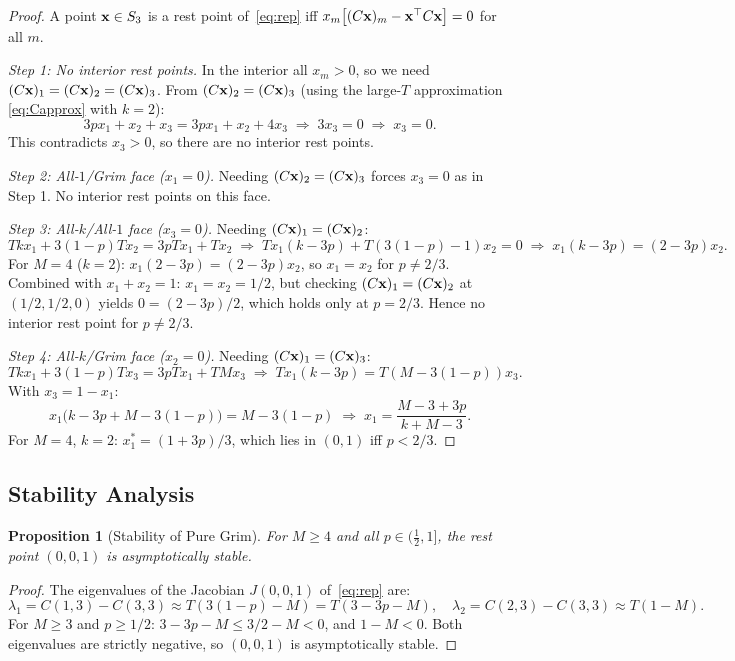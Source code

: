 \documentclass[12pt,a4paper]{article}
\newtheorem{proposition}{Proposition}[section]
\begin{document}
\begin{proof}
A point ${\bf x}\in S_3$ is a rest point of~\eqref{eq:rep} iff
$x_m\bigl[(C{\bf x})_m - {\bf x}^\top C{\bf x}\bigr]=0$ for all $m$.

\medskip
\noindent\textit{Step 1: No interior rest points.}
In the interior all $x_m>0$, so we need $(C{\bf x})_1=(C{\bf x})_2=(C{\bf x})_3$.
From $(C{\bf x})_2=(C{\bf x})_3$ (using the large-$T$ approximation
\eqref{eq:Capprox} with $k=2$):
\[
  3px_1+x_2+x_3 = 3px_1+x_2+4x_3
  \;\Rightarrow\; 3x_3=0\;\Rightarrow\; x_3=0.
\]
This contradicts $x_3>0$, so there are no interior rest points.

\medskip
\noindent\textit{Step 2: All-$1$/Grim face ($x_1=0$).}
Needing $(C{\bf x})_2=(C{\bf x})_3$ forces $x_3=0$ as in Step 1.
No interior rest points on this face.

\medskip
\noindent\textit{Step 3: All-$k$/All-$1$ face ($x_3=0$).}
Needing $(C{\bf x})_1=(C{\bf x})_2$:
\[
  Tkx_1+3(1-p)Tx_2 = 3pTx_1+Tx_2
  \;\Rightarrow\; Tx_1(k-3p)+T(3(1-p)-1)x_2=0
  \;\Rightarrow\; x_1(k-3p)=(2-3p)x_2.
\]
For $M=4$ ($k=2$): $x_1(2-3p)=(2-3p)x_2$, so $x_1=x_2$ for $p\neq 2/3$.
Combined with $x_1+x_2=1$: $x_1=x_2=1/2$, but checking $(C{\bf x})_1=(C{\bf x})_2$
at $(1/2,1/2,0)$ yields $0=(2-3p)/2$, which holds only at $p=2/3$. Hence no
interior rest point for $p\neq 2/3$.

\medskip
\noindent\textit{Step 4: All-$k$/Grim face ($x_2=0$).}
Needing $(C{\bf x})_1=(C{\bf x})_3$:
\[
  Tkx_1+3(1-p)Tx_3 = 3pTx_1+TMx_3
  \;\Rightarrow\; Tx_1(k-3p)=T(M-3(1-p))x_3.
\]
With $x_3=1-x_1$:
\[
  x_1\bigl(k-3p+M-3(1-p)\bigr) = M-3(1-p)
  \;\Rightarrow\; x_1 = \frac{M-3+3p}{k+M-3}.
\]
For $M=4$, $k=2$: $x_1^*=(1+3p)/3$, which lies in $(0,1)$ iff $p<2/3$.
\end{proof}

\subsection{Stability Analysis}

\begin{proposition}[Stability of Pure Grim]\label{prop:stab_grim}
For $M\geq 4$ and all $p\in(\tfrac{1}{2},1]$, the rest point $(0,0,1)$ is
asymptotically stable.
\end{proposition}

\begin{proof}
The eigenvalues of the Jacobian $J(0,0,1)$ of~\eqref{eq:rep} are:
\[
  \lambda_1 = C(1,3)-C(3,3)\approx T(3(1-p)-M)=T(3-3p-M),\quad
  \lambda_2 = C(2,3)-C(3,3)\approx T(1-M).
\]
For $M\geq 3$ and $p\geq 1/2$: $3-3p-M\leq 3/2-M<0$, and $1-M<0$.
Both eigenvalues are strictly negative, so $(0,0,1)$ is asymptotically stable.
\end{proof}
\end{document}
